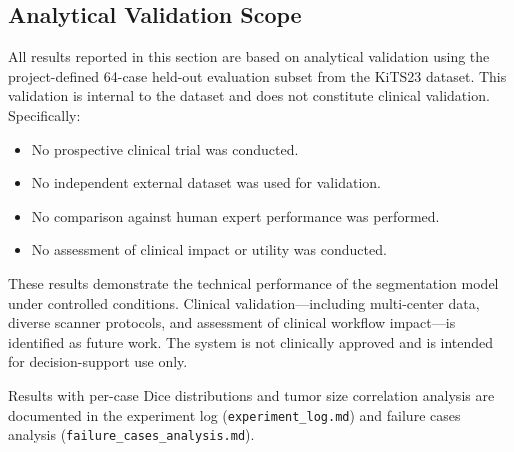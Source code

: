 \subsection{Analytical Validation Scope}

All results reported in this section are based on analytical validation using the project-defined 64-case held-out evaluation subset from the KiTS23 dataset. This validation is internal to the dataset and does not constitute clinical validation. Specifically:

\begin{itemize}
    \item No prospective clinical trial was conducted.
    \item No independent external dataset was used for validation.
    \item No comparison against human expert performance was performed.
    \item No assessment of clinical impact or utility was conducted.
\end{itemize}

These results demonstrate the technical performance of the segmentation model under controlled conditions. Clinical validation---including multi-center data, diverse scanner protocols, and assessment of clinical workflow impact---is identified as future work. The system is not clinically approved and is intended for decision-support use only.

Results with per-case Dice distributions and tumor size correlation analysis are documented in the experiment log (\texttt{experiment\_log.md}) and failure cases analysis (\texttt{failure\_cases\_analysis.md}).
